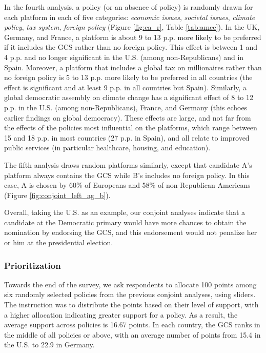\documentclass[12pt,english]{article}
\begin{document}
In the fourth analysis, a policy (or an absence of policy) is randomly drawn for each platform in each of five categories: \textit{economic issues}, \textit{societal issues}, \textit{climate policy}, \textit{tax system}, \textit{foreign policy} (Figure \ref{fig:ca_r}, Table \ref{tab:amce}). 
In the UK, Germany, and France, a platform is about 9 to 13 p.p. more likely to be preferred if it includes the GCS rather than no foreign policy. %
This effect is between 1 and 4 p.p. and no longer significant in the U.S. (among non-Republicans) and in Spain. Moreover, a platform that includes a global tax on millionaires rather than no foreign policy is 5 to 13 p.p. more likely to be preferred in all countries (the effect is significant and at least 9 p.p. in all countries but Spain). 
Similarly, a global democratic assembly on climate change has a significant effect of 8 to 12 p.p. in the U.S. (among non-Republicans), France, and Germany (this echoes earlier findings on global democracy\citep{ghassim_who_2020}). 
These effects are large, and not far from the effects of the policies most influential on the platforms, which range between 15 and 18 p.p. in most countries (27 p.p. in Spain), and all relate to improved public services (in particular healthcare, housing, and education).
 
The fifth analysis draws random platforms similarly, except that candidate A's platform always contains the GCS while B's includes no foreign policy. In this case, A is chosen by 60\% of Europeans %
and 58\% of non-Republican Americans (Figure \ref{fig:conjoint_left_ag_b}). %

Overall, taking the U.S. as an example, our conjoint analyses indicate that a candidate at the Democratic primary would have more chances to obtain the nomination by endorsing the GCS, and this endorsement would not penalize her or him at the presidential election. 
\subsubsection{Prioritization}\label{subsubsec:prioritization} %

Towards the end of the survey, we ask respondents to allocate 100 points among six randomly selected policies from the previous conjoint analyses, using sliders. The instruction was to distribute the points based on their level of support, with a higher allocation indicating greater support for a policy. %
As a result, the average support across policies is 16.67 points. %
In each country, the GCS ranks in the middle of all policies or above, with an average number of points from 15.4 in the U.S. to 22.9 in Germany.%
\end{document}

